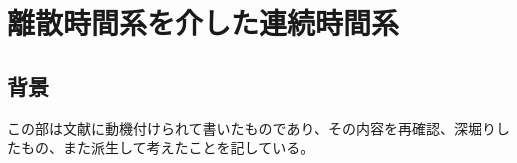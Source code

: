 \part{離散時間系を介した連続時間系}
    \chapter{背景}
        この部は文献\cite{digital-servo}に動機付けられて書いたものであり、その内容を再確認、深堀りしたもの、また派生して考えたことを記している。
    
    
